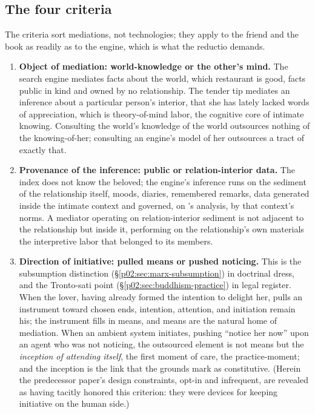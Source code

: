 \subsection{The four criteria}
\label{p02:sec:synthesis-criteria}

The criteria sort mediations, not technologies; they apply to the friend and the book as readily as to the engine, which is what the reductio demands.

\begin{enumerate}[leftmargin=2em, itemsep=0.35em]
\item \textbf{Object of mediation: world-knowledge or the other's mind.} The search engine mediates facts about the world, which restaurant is good, facts public in kind and owned by no relationship. The tender tip mediates an inference about a particular person's interior, that she has lately lacked words of appreciation, which is theory-of-mind labor, the cognitive core of intimate knowing. Consulting the world's knowledge of the world outsources nothing of the knowing-of-her; consulting an engine's model of her outsources a tract of exactly that.
\item \textbf{Provenance of the inference: public or relation-interior data.} The index does not know the beloved; the engine's inference runs on the sediment of the relationship itself, moods, diaries, remembered remarks, data generated inside the intimate context and governed, on \textcite{nissenbaum2009privacy}'s analysis, by that context's norms. A mediator operating on relation-interior sediment is not adjacent to the relationship but inside it, performing on the relationship's own materials the interpretive labor that belonged to its members.
\item \textbf{Direction of initiative: pulled means or pushed noticing.} This is the subsumption distinction (\S\ref{p02:sec:marx-subsumption}) in doctrinal dress, and the Tronto-sati point (\S\ref{p02:sec:buddhism-practice}) in legal register. When the lover, having already formed the intention to delight her, pulls an instrument toward chosen ends, intention, attention, and initiation remain his; the instrument fills in means, and means are the natural home of mediation. When an ambient system initiates, pushing ``notice her now'' upon an agent who was not noticing, the outsourced element is not means but the \emph{inception of attending itself}, the first moment of care, the practice-moment; and the inception is the link that the grounds mark as constitutive. (Herein the predecessor paper's design constraints, opt-in and infrequent, are revealed as having tacitly honored this criterion: they were devices for keeping initiative on the human side.)

\end{enumerate}

